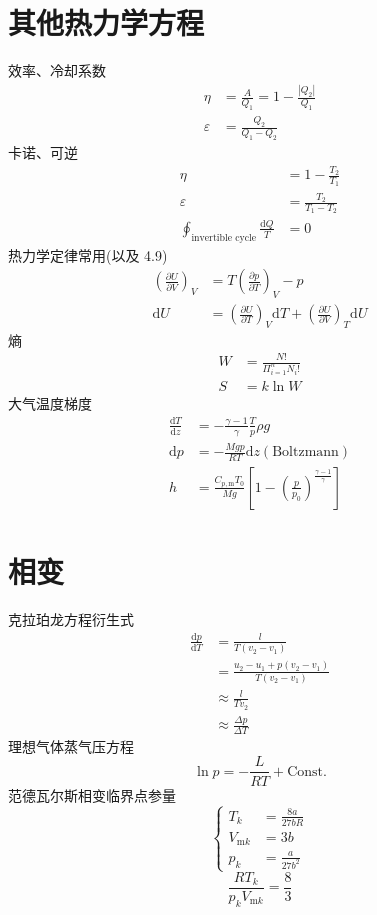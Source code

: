\documentclass[10pt]{article}
\numberwithin{equation}{section}
\begin{document}
\begin{multicols}{3}
\begin{CJK}{UTF8}{gbsn}
\section{其他热力学方程}
效率、冷却系数
\begin{align}
  \eta&=\frac{A}{Q_1}=1-\frac{|Q_2|}{Q_1} \\
  \varepsilon &=\frac{Q_2}{Q_1-Q_2}
\end{align}
卡诺、可逆
\begin{align}
  \eta&=1-\frac{T_2}{T_1} \\
  \varepsilon &=\frac{T_2}{T_1-T_2} \\
  \oint_{\textrm{invertible cycle}}\frac{\textrm{d}Q}{T}&=0
\end{align}
热力学定律常用(以及 4.9)
\begin{align}
  \left(\frac{\partial U}{\partial V}\right)_V&=T\left(\frac{\partial p}{\partial T}\right)_V-p \\
  \textrm{d}U&=\left(\frac{\partial U}{\partial T}\right)_V \textrm{d}T+\left(\frac{\partial U}{\partial V}\right)_T \textrm{d}U
\end{align}
熵
\begin{align}
  W&=\frac{N!}{\Pi_{i=1}^n N_i!} \\
  S&=k\ln W
\end{align}
大气温度梯度
\begin{align}
  \frac{\textrm{d}T}{\textrm{d}z}&=-\frac{\gamma-1}{\gamma} \frac{T}{p} \rho g\\
  \textrm{d}p&=-\frac{Mgp}{RT}\textrm{d}z(\textrm{Boltzmann})\\
  h&=\frac{C_{p,\textrm{m}}T_0}{Mg}\left[1-\left(\frac{p}{p_0}\right)^{\frac{\gamma -1}{\gamma}}\right]
\end{align}
\section{相变}
克拉珀龙方程衍生式
\begin{align}
  \frac{\textrm{d}p}{\textrm{d}T}&=\frac{l}{T(v_2-v_1)} \nonumber\\
  &=\frac{u_2-u_1+p(v_2-v_1)}{T(v_2-v_1)} \nonumber \\
  &\approx \frac{l}{Tv_2} \nonumber \\
  &\approx \frac{\Delta p}{\Delta T}
\end{align}
理想气体蒸气压方程
\begin{equation}
  \ln p=-\frac{L}{RT}+\textrm{Const.}
\end{equation}
范德瓦尔斯相变临界点参量
\begin{equation}
  \left\{
    \begin{aligned}
    T_k&=\frac{8a}{27bR}\\
    V_{\textrm{m}k}&=3b \\
    p_{k}&=\frac{a}{27b^2}
    \end{aligned}
  \right.
\end{equation}
\begin{equation}
  \frac{RT_k}{p_kV_{\textrm{m}k}}=\frac{8}{3}
\end{equation}

\end{CJK}
\end{multicols}
\end{document}
